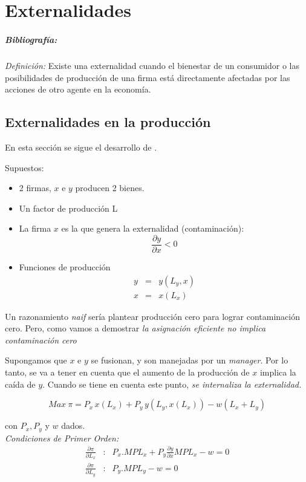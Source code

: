 \section{Externalidades}

\subparagraph{Bibliografía:} \cite{binhoff} 
	
\emph{Definición:} Existe una externalidad cuando el bienestar de
un consumidor o las posibilidades de producción de una firma está
directamente afectadas por las acciones de otro agente en la
economía.

\subsection{Externalidades en la producción}

En esta sección se sigue el desarrollo de \citet{binhoff}.

Supuestos:

\begin{itemize}
 \item 2 firmas, $x$ e $y$ producen 2 bienes.
 \item Un factor de producción L
 \item La firma $x$ es la que genera la externalidad
 (contaminación):
$$\frac{\partial y}{\partial x}<0$$
 \item Funciones de producción
    \begin{eqnarray*}
        y&=&y(L_{y},x) \\
        x&=&x(L_{x})
    \end{eqnarray*}
\end{itemize}

Un razonamiento \emph{naif} sería plantear producción cero para
lograr contaminación cero. Pero, como vamos a demostrar \emph{la
asignación eficiente no implica contaminación cero}

Supongamos que $x$ e $y$ se fusionan, y son manejadas por un \textit{manager}.
Por lo tanto, se va a tener en cuenta que el aumento de la
producción de $x$ implica la caída de $y$. Cuando se tiene en cuenta este punto, \emph{se internaliza la
externalidad.}

$$ Max \: \pi = P_x \, x(L_x)+P_y \, y(L_y,x(L_x))-w(L_x+L_y)$$

con $P_x, P_y$ y $w$ dados.\\


\emph{Condiciones de Primer Orden:}
\begin{eqnarray*}
	\frac{\partial \pi}{\partial L_x} &:& P_x.MPL_x+P_y \frac{\partial
	y}{\partial x}MPL_x-w=0 \\
	\frac{\partial \pi}{\partial L_y}&:& P_y.MPL_y-w=0
\end{eqnarray*}


